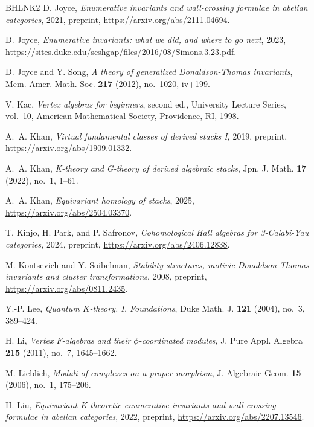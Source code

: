\documentclass[12pt]{amsart}
\theoremstyle{definition}
\newcommand{\1}{\mathbf 1}
\begin{document}
\begin{thebibliography}{BHLNK2}
D. Joyce, \emph{Enumerative invariants and wall-crossing formulae in abelian categories}, 2021, preprint, \url{https://arxiv.org/abs/2111.04694}.

D. Joyce, \emph{Enumerative invariants: what we did, and where to go next}, 2023, \url{https://sites.duke.edu/scshgap/files/2016/08/Simons.3.23.pdf}.

D. Joyce and Y. Song, \emph{A theory of generalized {D}onaldson-{T}homas invariants}, Mem. Amer. Math. Soc. \textbf{217} (2012), no.~1020, iv+199.

V. Kac, \emph{Vertex algebras for beginners}, second ed., University Lecture Series, vol.~10, American Mathematical Society, Providence, RI, 1998.

A.~A. Khan, \emph{Virtual fundamental classes of derived stacks I}, 2019, preprint, \url{https://arxiv.org/abs/1909.01332}.

A.~A. Khan, \emph{K-theory and {G}-theory of derived algebraic stacks}, Jpn. J. Math. \textbf{17} (2022), no.~1, 1--61.

A.~A. Khan, \emph{Equivariant homology of stacks}, 2025, \url{https://arxiv.org/abs/2504.03370}.

T. Kinjo, H. Park, and P. Safronov, \emph{Cohomological Hall algebras for 3-Calabi-Yau categories}, 2024, preprint, \url{https://arxiv.org/abs/2406.12838}.

M. Kontsevich and Y. Soibelman, \emph{Stability structures, motivic Donaldson-Thomas invariants and cluster transformations}, 2008, preprint, \url{https://arxiv.org/abs/0811.2435}.

Y.-P. Lee, \emph{Quantum {$K$}-theory. {I}. {F}oundations}, Duke Math. J. \textbf{121} (2004), no.~3, 389--424.

H. Li, \emph{Vertex {$F$}-algebras and their {$\phi$}-coordinated modules}, J. Pure Appl. Algebra \textbf{215} (2011), no.~7, 1645--1662.

M. Lieblich, \emph{Moduli of complexes on a proper morphism}, J. Algebraic Geom. \textbf{15} (2006), no.~1, 175--206.

H. Liu, \emph{Equivariant K-theoretic enumerative invariants and wall-crossing formulae in abelian categories}, 2022, preprint, \url{https://arxiv.org/abs/2207.13546}.


\end{thebibliography}
\end{document}
